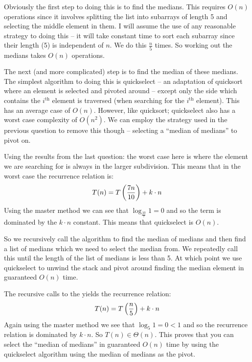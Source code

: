 \documentclass[10pt,\jkfside,a4paper]{article}
\begin{document}
\begin{enumerate}
Obviously the first step to doing this is to find the medians. This requires $O(n)$ operations 
since it involves splitting the list into subarrays of length 5 and selecting the middle element 
in them. I will assume the use of any reasonable strategy to doing this -- it will take constant time 
to sort each subarray since their length (5) is independent of $n$. We do this $\frac{n}{5}$ times. 
So working out the medians takes $O(n)$ operations.

The next (and more complicated) step is to find the median of these medians. The simplest 
algorithm to doing this is quickselect -- an adaptation of quicksort where an element 
is selected and pivoted around -- except only the side which contains the $i^\text{th}$ 
element is traversed (when searching for the $i^\text{th}$ element). This has an average 
case of $O(n)$. However, like quicksort; quickselect  also has a worst case complexity of 
$O(n^2)$. We can employ the strategy used in the previous question to remove this though -- 
selecting a ``median of medians'' to pivot on. 

Using the results from the last question: the worst case here is where the element we are 
searching for is always in the larger subdivision. This means that 
in the worst case the recurrence relation is:
\begin{equation}
T(n) = T\left(\frac{7n}{10}\right) + k\cdot n \\
\end{equation}
Using the master method we can see that $\log_{\frac{10}{7}}1 = 0$ and so the term is dominated 
by the $k \cdot n$ constant. This means that quickselect is $O(n)$.

So we recursively call the algorithm to find the median of medians and then find a list of 
medians which we need to select the median from. We repeatedly call this until the length of 
the list of medians is less than 5. At which point we use quickselect to unwind the stack 
and pivot around finding the median element in guaranteed $O(n)$ time.

The recursive calls to the  yields the recurrence relation:
\begin{equation}
T(n) = T\left(\frac{n}{5}\right) + k \cdot n \\
\end{equation}
Again using the master method we see that $\log_5 1 = 0 < 1$ and so the recurrence relation is 
dominated by $k \cdot n$. So $T(n) \in \Theta(n)$. This proves that you can select the ``median 
of medians'' in guaranteed $O(n)$ time by using the quickselect algorithm using the median 
of medians as the pivot.


\end{enumerate}
\end{document}
